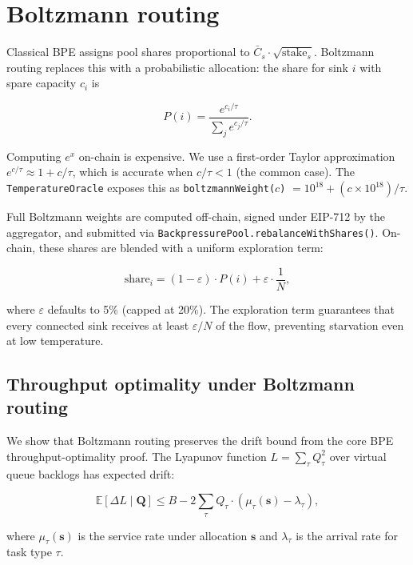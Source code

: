 \documentclass[11pt]{article}
\theoremstyle{definition}
\theoremstyle{remark}
\newcommand{\E}{\mathbb{E}}
\newcommand{\Csmooth}{\bar{C}}
\begin{document}
\section{Boltzmann routing}
\label{sec:boltz}

Classical BPE assigns pool shares proportional to $\Csmooth_s \cdot
\sqrt{\text{stake}_s}$. Boltzmann routing replaces this with a
probabilistic allocation: the share for sink $i$ with spare capacity
$c_i$ is

\begin{equation}
  P(i) = \frac{e^{c_i / \tau}}{\sum_j e^{c_j / \tau}}.
  \label{eq:boltzmann}
\end{equation}

Computing $e^x$ on-chain is expensive. We use a first-order Taylor
approximation $e^{c/\tau} \approx 1 + c/\tau$, which is accurate when
$c/\tau < 1$ (the common case). The \texttt{TemperatureOracle} exposes
this as \texttt{boltzmannWeight($c$)} $= 10^{18} + (c \times 10^{18})/\tau$.

Full Boltzmann weights are computed off-chain, signed under EIP-712 by
the aggregator, and submitted via
\texttt{BackpressurePool.rebalanceWithShares()}. On-chain, these
shares are blended with a uniform exploration term:

\begin{equation}
  \text{share}_i = (1 - \varepsilon) \cdot P(i) + \varepsilon \cdot \frac{1}{N},
  \label{eq:exploration}
\end{equation}

\noindent where $\varepsilon$ defaults to 5\% (capped at 20\%). The
exploration term guarantees that every connected sink receives at
least $\varepsilon / N$ of the flow, preventing starvation even at
low temperature.

\subsection{Throughput optimality under Boltzmann routing}

We show that Boltzmann routing preserves the drift bound from the
core BPE throughput-optimality proof. The Lyapunov function
$L = \sum_\tau Q_\tau^2$ over virtual queue backlogs has expected
drift:

\begin{equation}
  \E[\Delta L \mid \mathbf{Q}] \leq B - 2\sum_\tau Q_\tau \cdot
  (\mu_\tau(\mathbf{s}) - \lambda_\tau),
\end{equation}

\noindent where $\mu_\tau(\mathbf{s})$ is the service rate under
allocation $\mathbf{s}$ and $\lambda_\tau$ is the arrival rate for
task type $\tau$.
\end{document}
